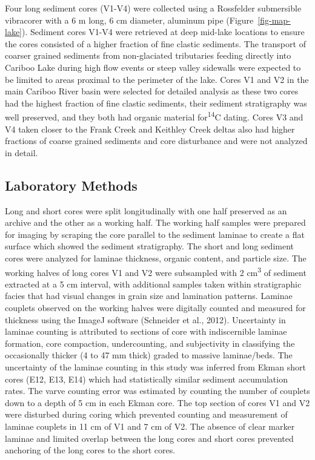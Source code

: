 \documentclass[
  letterpaper,
  DIV=11,
  numbers=noendperiod]{scrartcl}
\begin{document}
Four long sediment cores (V1-V4) were collected using a Rossfelder
submersible vibracorer with a 6 m long, 6 cm diameter, aluminum pipe
(Figure~\ref{fig-map-lake}). Sediment cores V1-V4 were retrieved at deep
mid-lake locations to ensure the cores consisted of a higher fraction of
fine clastic sediments. The transport of coarser grained sediments from
non-glaciated tributaries feeding directly into Cariboo Lake during high
flow events or steep valley sidewalls were expected to be limited to
areas proximal to the perimeter of the lake. Cores V1 and V2 in the main
Cariboo River basin were selected for detailed analysis as these two
cores had the highest fraction of fine clastic sediments, their sediment
stratigraphy was well preserved, and they both had organic material
for\textsuperscript{14}C dating. Cores V3 and V4 taken closer to the
Frank Creek and Keithley Creek deltas also had higher fractions of
coarse grained sediments and core disturbance and were not analyzed in
detail.

\hypertarget{laboratory-methods}{%
\subsection{Laboratory Methods}\label{laboratory-methods}}

Long and short cores were split longitudinally with one half preserved
as an archive and the other as a working half. The working half samples
were prepared for imaging by scraping the core parallel to the sediment
laminae to create a flat surface which showed the sediment stratigraphy.
The short and long sediment cores were analyzed for laminae thickness,
organic content, and particle size. The working halves of long cores V1
and V2 were subsampled with 2 cm\textsuperscript{3} of sediment
extracted at a 5 cm interval, with additional samples taken within
stratigraphic facies that had visual changes in grain size and
lamination patterns. Laminae couplets observed on the working halves
were digitally counted and measured for thickness using the ImageJ
software (Schneider et al., 2012). Uncertainty in laminae counting is
attributed to sections of core with indiscernible laminae formation,
core compaction, undercounting, and subjectivity in classifying the
occasionally thicker (4 to 47 mm thick) graded to massive laminae/beds.
The uncertainty of the laminae counting in this study was inferred from
Ekman short cores (E12, E13, E14) which had statistically similar
sediment accumulation rates. The varve counting error was estimated by
counting the number of couplets down to a depth of 5 cm in each Ekman
core. The top section of cores V1 and V2 were disturbed during coring
which prevented counting and measurement of laminae couplets in 11 cm of
V1 and 7 cm of V2. The absence of clear marker laminae and limited
overlap between the long cores and short cores prevented anchoring of
the long cores to the short cores.
\end{document}
